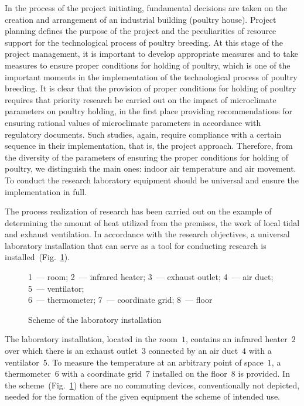 \documentclass[12pt,twoside]{article}
\newcommand{\FigRef}[2][]{(Fig.~\ref{#2}\textit{#1})}
\begin{document}
\begin{JGGarticle}
			In the process of the project initiating, fundamental decisions are taken on the creation and arrangement of an industrial building (poultry house). Project planning defines the purpose of the project and the peculiarities of resource support for the technological process of poultry breeding. At this stage of the project management, it is important to develop appropriate measures and to take measures to ensure proper conditions for holding of poultry, which is one of the important moments in the implementation of the technological process of poultry breeding. It is clear that the provision of proper conditions for holding of poultry requires that priority research be carried out on the impact of microclimate parameters on poultry holding, in the first place providing recommendations for ensuring rational values of microclimate parameters in accordance with regulatory documents. Such studies, again, require compliance with a certain sequence in their implementation, that is, the project approach. Therefore, from the diversity of the parameters of ensuring the proper conditions for holding of poultry, we distinguish the main ones: indoor air temperature and air movement. To conduct the research laboratory equipment should be universal and ensure the implementation in full.
			
			The process realization of research has been carried out on the example of determining the amount of heat utilized from the premises, the work of local tidal and exhaust ventilation. In accordance with the research objectives, a universal laboratory installation that can serve as a tool for conducting research is installed~\FigRef{fig:labinst}.
			\begin{figure}[!hbt]
				\caption{Scheme of the laboratory installation}
				\begin{center}
					1~--- room; 2~--- infrared heater; 3~--- exhaust outlet; 4~--- air duct; 5~--- ventilator;\\6~--- thermometer; 7~--- coordinate grid; 8~--- floor
				\end{center}
				\label{fig:labinst}
			\end{figure}
		
			The laboratory installation, located in the room~$1$, contains an infrared heater~$2$ over which there is an exhaust outlet~$3$ connected by an air duct~$4$ with a ventilator~$5$. To measure the temperature at an arbitrary point of space~$1$, a thermometer~$6$ with a coordinate grid~$7$ installed on the floor~$8$ is provided. In the scheme~\FigRef{fig:labinst} there are no commuting devices, conventionally not depicted, needed for the formation of the given equipment the scheme of intended use.
			

\end{JGGarticle}
\end{document}
